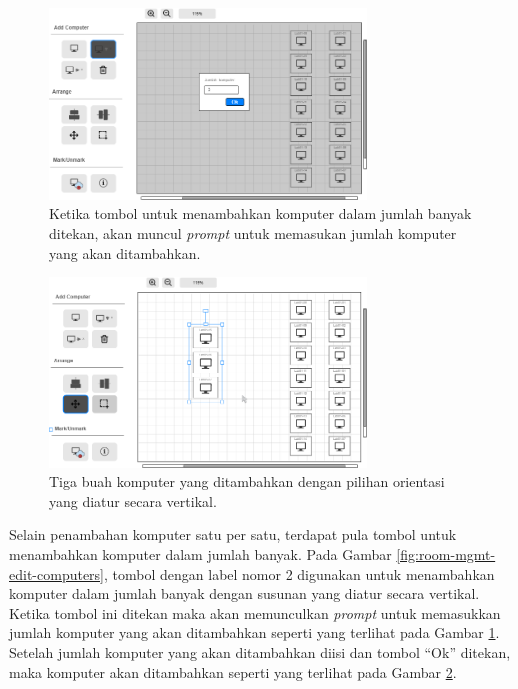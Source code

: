 \documentclass[a4paper,twoside]{article}
\begin{document}
\begin{enumerate}
\begin{itemize}
\begin{itemize}
                
                  \begin{figure}[H]
                    \centering
                    \includegraphics[width=0.75\textwidth]{images/ui designs/room-management/insert-hor.png}
                    \caption{Ketika tombol untuk menambahkan komputer dalam jumlah banyak ditekan, akan muncul \textit{prompt} untuk memasukan jumlah komputer yang akan ditambahkan.}
                    \label{fig:room-mgmt-edit-computers-add-ver-bef}
                \end{figure}
                
                  \begin{figure}[H]
                    \centering
                    \includegraphics[width=0.75\textwidth]{images/ui designs/room-management/insert-hor-2.png}
                    \caption{Tiga buah komputer yang ditambahkan dengan pilihan orientasi yang diatur secara vertikal.}
                    \label{fig:room-mgmt-edit-computers-add-ver-aft}
                \end{figure}
                
                Selain penambahan komputer satu per satu, terdapat pula tombol untuk menambahkan komputer dalam jumlah banyak. Pada Gambar \ref{fig:room-mgmt-edit-computers}, tombol dengan label nomor 2 digunakan untuk menambahkan komputer dalam jumlah banyak dengan susunan yang diatur secara vertikal. Ketika tombol ini ditekan maka akan memunculkan \textit{prompt} untuk memasukkan jumlah komputer yang akan ditambahkan seperti yang terlihat pada Gambar \ref{fig:room-mgmt-edit-computers-add-ver-bef}. Setelah jumlah komputer yang akan ditambahkan diisi dan tombol ``Ok'' ditekan, maka komputer akan ditambahkan seperti yang terlihat pada Gambar \ref{fig:room-mgmt-edit-computers-add-ver-aft}. 
                

\end{itemize}
\end{itemize}
\end{enumerate}
\end{document}
